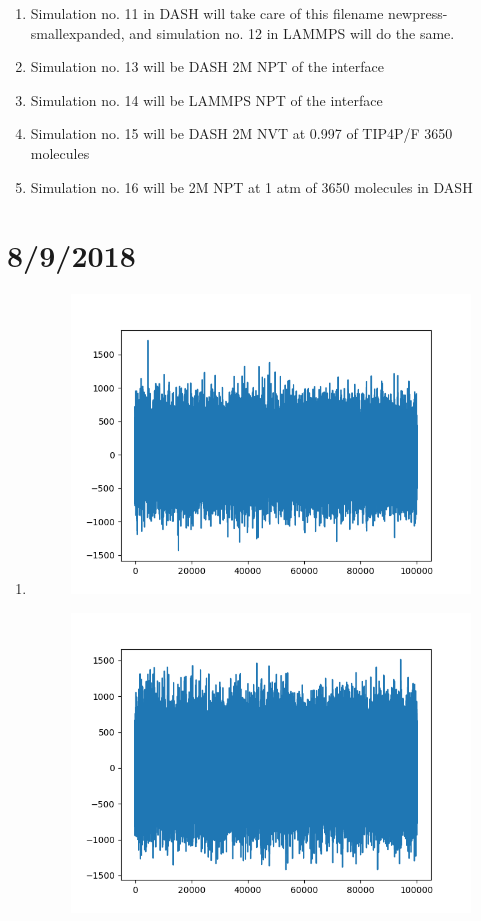 \documentclass[12pt,reqno]{amsart}
\numberwithin{equation}{section}
\begin{document}
\begin{enumerate}
\item Simulation no. 11 in DASH will take care of this filename newpress-smallexpanded, and simulation no. 12 in LAMMPS will do the same. 
\item Simulation no. 13 will be DASH 2M NPT of the interface
\item Simulation no. 14 will be LAMMPS NPT of the interface
\item Simulation no. 15 will be DASH 2M NVT at 0.997 of TIP4P/F 3650 molecules
\item Simulation no. 16 will be 2M NPT at 1 atm of 3650 molecules in DASH
\end{enumerate}


\section{8/9/2018}
\begin{enumerate}
\item 
\begin{figure}[H]
\centering
\includegraphics[scale=0.7]{pressures_newpress-NPT}
\end{figure}
\begin{figure}[H]
\centering
\includegraphics[scale=0.7]{pressures_newpress-NPT-lammps}
\end{figure}
\end{enumerate}
\end{document}
